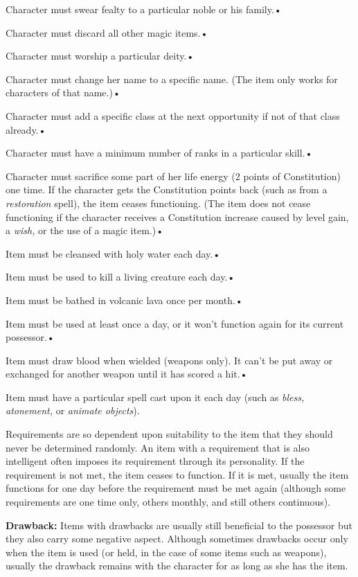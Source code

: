 Character must swear fealty to a particular noble or his family.•

Character must discard all other magic items.•

Character must worship a particular deity.•

Character must change her name to a specific name. (The item only works for characters 
of that name.)•

Character must add a specific class at the next opportunity if not of that class 
already.•

Character must have a minimum number of ranks in a particular skill.•

Character must sacrifice some part of her life energy (2 points of Constitution) 
one time. If the character gets the Constitution points back (such as from a \textit{restoration 
}spell), the item ceases functioning. (The item does not cease functioning if the 
character receives a Constitution increase caused by level gain, a \textit{wish, 
}or the use of a magic item.)•

Item must be cleansed with holy water each day.•

Item must be used to kill a living creature each day.•

Item must be bathed in volcanic lava once per month.•

Item must be used at least once a day, or it won't function again for its current 
possessor.•

Item must draw blood when wielded (weapons only). It can't be put away or exchanged 
for another weapon until it has scored a hit.•

Item must have a particular spell cast upon it each day (such as \textit{bless, 
atonement, }or \textit{animate objects}).

Requirements are so dependent upon suitability to the item that they should never 
be determined randomly. An item with a requirement that is also intelligent often 
imposes its requirement through its personality. If the requirement is not met, 
the item ceases to function. If it is met, usually the item functions for one day 
before the requirement must be met again (although some requirements are one time 
only, others monthly, and still others continuous).

\textbf{Drawback:} Items with drawbacks are usually still beneficial to the possessor 
but they also carry some negative aspect. Although sometimes drawbacks occur only 
when the item is used (or held, in the case of some items such as weapons), usually 
the drawback remains with the character for as long as she has the item.

